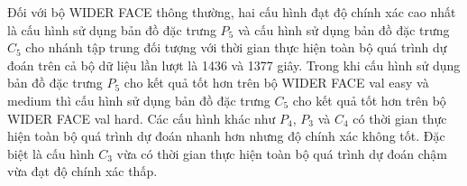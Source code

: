 {    \noindent
    Đối với bộ WIDER FACE thông thường, hai cấu hình đạt độ chính xác cao nhất là cấu hình sử dụng bản đồ đặc trưng ${P}_{5}$ và cấu hình sử dụng bản đồ đặc trưng ${C}_{5}$ cho nhánh tập trung đối tượng với thời gian thực hiện toàn bộ quá trình dự đoán trên cả bộ dữ liệu lần lượt là 1436 và 1377 giây.
    Trong khi cấu hình sử dụng bản đồ đặc trưng ${P}_{5}$ cho kết quả tốt hơn trên bộ WIDER FACE val easy và medium thì cấu hình sử dụng bản đồ đặc trưng ${C}_{5}$ cho kết quả tốt hơn trên bộ WIDER FACE val hard.
    Các cấu hình khác như ${P}_{4}$, ${P}_{3}$ và ${C}_{4}$ có thời gian thực hiện toàn bộ quá trình dự đoán nhanh hơn nhưng độ chính xác không tốt.
    Đặc biệt là cấu hình ${C}_{3}$ vừa có thời gian thực hiện toàn bộ quá trình dự đoán chậm vừa đạt độ chính xác thấp.

}

